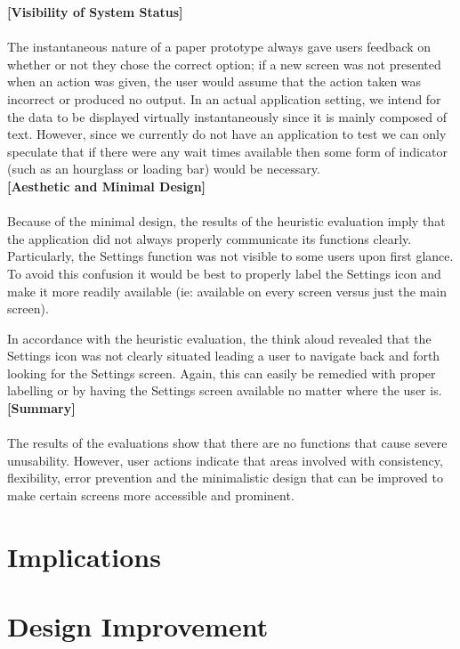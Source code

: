 \documentclass[pdftex,12pt,a4paper]{report}
\begin{document}
\noindent\textbf{[Visibility of System Status]}\\\\
The instantaneous nature of a paper prototype always gave users feedback on whether or not they chose the correct option; if a new screen was not presented when an action was given, the user would assume that the action taken was incorrect or produced no output. In an actual application setting, we intend for the data to be displayed virtually instantaneously since it is mainly composed of text. However, since we currently do not have an application to test we can only speculate that if there were any wait times available then some form of indicator (such as an hourglass or loading bar) would be necessary.\\

\noindent\textbf{[Aesthetic and Minimal Design]}\\\\
Because of the minimal design, the results of the heuristic evaluation imply that the application did not always properly communicate its functions clearly. Particularly, the Settings function was not visible to some users upon first glance. To avoid this confusion it would be best to properly label the Settings icon and make it more readily available (ie: available on every screen versus just the main screen).

In accordance with the heuristic evaluation, the think aloud revealed that the Settings icon was not clearly situated leading a user to navigate back and forth looking for the Settings screen. Again, this can easily be remedied with proper labelling or by having the Settings screen available no matter where the user is.\\

\noindent\textbf{[Summary]}\\\\
The results of the evaluations show that there are no functions that cause severe unusability. However, user actions indicate that areas involved with consistency, flexibility, error prevention and the minimalistic design that can be improved to make certain screens more accessible and prominent.

\chapter{Implications}
\chapter{Design Improvement}
\end{document}
